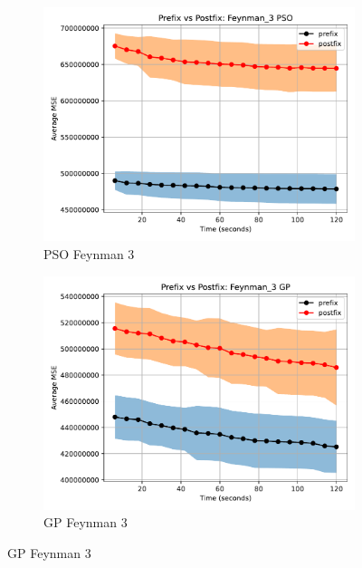 \documentclass[12pt]{iopart}
\begin{document}
\begin{figure}
    \vspace{0.5cm}
    
    \begin{subfigure}[b]{0.4\textwidth}
        \includegraphics[width=\linewidth, keepaspectratio]{AIFeynman_Benchmarks/PrePostFeynman_3PSO.pdf}
        \caption{PSO Feynman 3}
        \label{subfig:feynman_3_PSO}
    \end{subfigure}
    \begin{subfigure}[b]{0.4\textwidth}
        \includegraphics[width=\linewidth, keepaspectratio]{AIFeynman_Benchmarks/PrePostFeynman_3GP.pdf}
        \caption{GP Feynman 3}
        \label{subfig:feynman_3_GP}
    \end{subfigure}
    

\end{figure}
\end{document}
